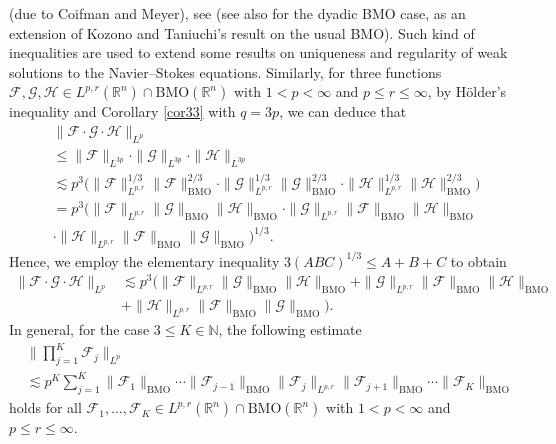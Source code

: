 \documentclass{birkjour}
\theoremstyle{definition}
\theoremstyle{remark}
\numberwithin{equation}{section}
\begin{document}
(due to Coifman and Meyer), see \cite[Lemma 1]{Kozono}(see also \cite{nakai3} for the dyadic BMO case, as an extension of Kozono and Taniuchi's result on the usual BMO). Such kind of inequalities are used to extend some results on uniqueness and regularity of weak solutions to the Navier--Stokes equations. Similarly, for three functions $\mathcal{F},\mathcal{G},\mathcal{H}\in L^{p,r}(\mathbb R^n)\cap\mathrm{BMO}(\mathbb R^n)$ with $1<p<\infty$ and $p\leq r\leq\infty$, by H\"{o}lder's inequality and Corollary \ref{cor33} with $q=3p$, we can deduce that
\begin{equation*}
\begin{split}
&\|\mathcal{F}\cdot \mathcal{G}\cdot \mathcal{H}\|_{L^p}\\
&\leq\|\mathcal{F}\|_{L^{3p}}\cdot\|\mathcal{G}\|_{L^{3p}}\cdot\|\mathcal{H}\|_{L^{3p}}\\
&\lesssim p^3
\Big(\|\mathcal{F}\|_{L^{p,r}}^{1/3}\|\mathcal{F}\|_{\mathrm{BMO}}^{2/3}\cdot\|\mathcal{G}\|_{L^{p,r}}^{1/3}\|\mathcal{G}\|_{\mathrm{BMO}}^{2/3}
\cdot\|\mathcal{H}\|_{L^{p,r}}^{1/3}\|\mathcal{H}\|_{\mathrm{BMO}}^{2/3}\Big)\\
&=p^3\Big(\|\mathcal{F}\|_{L^{p,r}}\|\mathcal{G}\|_{\mathrm{BMO}}\|\mathcal{H}\|_{\mathrm{BMO}}
\cdot\|\mathcal{G}\|_{L^{p,r}}\|\mathcal{F}\|_{\mathrm{BMO}}\|\mathcal{H}\|_{\mathrm{BMO}}\\
&\cdot\|\mathcal{H}\|_{L^{p,r}}\|\mathcal{F}\|_{\mathrm{BMO}}\|\mathcal{G}\|_{\mathrm{BMO}}\Big)^{1/3}.
\end{split}
\end{equation*}
Hence, we employ the elementary inequality $3(ABC)^{1/3}\leq A+B+C$ to obtain
\begin{equation*}
\begin{split}
\|\mathcal{F}\cdot \mathcal{G}\cdot \mathcal{H}\|_{L^p}
&\lesssim p^3\Big(\|\mathcal{F}\|_{L^{p,r}}\|\mathcal{G}\|_{\mathrm{BMO}}\|\mathcal{H}\|_{\mathrm{BMO}}
+\|\mathcal{G}\|_{L^{p,r}}\|\mathcal{F}\|_{\mathrm{BMO}}\|\mathcal{H}\|_{\mathrm{BMO}}\\
&+\|\mathcal{H}\|_{L^{p,r}}\|\mathcal{F}\|_{\mathrm{BMO}}\|\mathcal{G}\|_{\mathrm{BMO}}\Big).
\end{split}
\end{equation*}
In general, for the case $3\leq K\in \mathbb{N}$, the following estimate
\begin{equation*}
\begin{split}
&\bigg\|\prod_{j=1}^K \mathcal{F}_j\bigg\|_{L^p}\\
&\lesssim p^{K}
\sum_{j=1}^{K}\|\mathcal{F}_1\|_{\mathrm{BMO}}\cdots\|\mathcal{F}_{j-1}\|_{\mathrm{BMO}}
\|\mathcal{F}_j\|_{L^{p,r}}\|\mathcal{F}_{j+1}\|_{\mathrm{BMO}}\cdots\|\mathcal{F}_K\|_{\mathrm{BMO}}
\end{split}
\end{equation*}
holds for all $\mathcal{F}_1,\dots,\mathcal{F}_{K}\in L^{p,r}(\mathbb R^n)\cap\mathrm{BMO}(\mathbb R^n)$ with $1<p<\infty$ and $p\leq r\leq\infty$.
\end{document}
